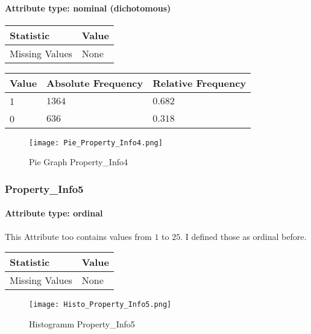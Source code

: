 \paragraph{Attribute type: nominal (dichotomous)}

\begin{table}[H]
	\renewcommand{\arraystretch}{1.25}
	\begin{tabular}{l|l}
		\textbf{Statistic} & \textbf{Value}\\\hline
		Missing Values& None\\\hline
	\end{tabular}
\end{table}
\begin{table}[H]
	\renewcommand{\arraystretch}{1.25}
	\begin{tabular}{l|l|l}
		\textbf{Value} & \textbf{Absolute Frequency} & \textbf{Relative Frequency}\\\hline
		1&$1364$&$0.682$\\\hline
		0&$636$&$0.318$
	\end{tabular}
\end{table}
\begin{figure}[H]
	\begin{center}
		\texttt{[image: Pie\_Property\_Info4.png]}
	\end{center}
	\caption{Pie Graph Property\_Info4}
\end{figure}

\subsubsection{Property\_Info5}
\paragraph{Attribute type: ordinal} This Attribute too contains values from $1$ to $25$. I defined those as ordinal before.

\begin{table}[H]
	\renewcommand{\arraystretch}{1.25}
	\begin{tabular}{l|l}
		\textbf{Statistic} & \textbf{Value}\\\hline
		Missing Values& None\\\hline
	\end{tabular}
\end{table}

\begin{figure}[H]
	\begin{center}
		\texttt{[image: Histo\_Property\_Info5.png]}
	\end{center}
	\caption{Histogramm Property\_Info5}
\end{figure}


